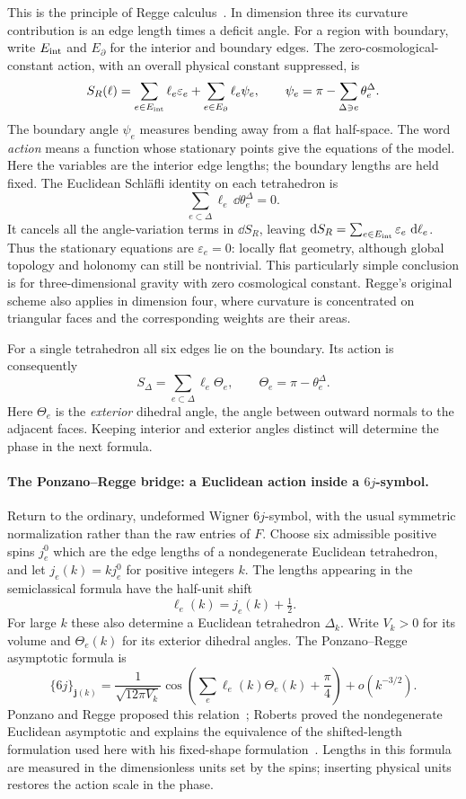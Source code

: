 This is the principle of Regge calculus~\cite{Regge1961}.
In dimension three its curvature contribution is an edge length
times a deficit angle. For a region with boundary, write
$E_{\rm int}$ and $E_{\partial}$ for the interior and boundary edges.
The zero-cosmological-constant action, with an overall physical
constant suppressed, is
\[
 S_R(\ell)=\sum_{e\in E_{\rm int}}\ell_e\varepsilon_e
          +\sum_{e\in E_{\partial}}\ell_e\psi_e,
 \qquad
 \psi_e=\pi-\sum_{\Delta\ni e}\theta_e^\Delta.
\]
The boundary angle $\psi_e$ measures bending away from a flat
half-space. The word \emph{action} means a function whose stationary
points give the equations of the model. Here the variables are the
interior edge lengths; the boundary lengths are held fixed.
The Euclidean Schl\"afli identity on each tetrahedron is
\[
 \sum_{e\subset\Delta}\ell_e\,\dd\theta_e^\Delta=0.
\]
It cancels all the angle-variation terms in $\dd S_R$, leaving
$\mathop{}\!\mathrm d S_R=\sum_{e\in E_{\rm int}}\varepsilon_e\,\mathop{}\!\mathrm d\ell_e$.
Thus the stationary equations are $\varepsilon_e=0$: locally flat
geometry, although global topology and holonomy can still be nontrivial.
This particularly simple conclusion is for three-dimensional gravity
with zero cosmological constant. Regge's original scheme also applies
in dimension four, where curvature is concentrated on triangular
faces and the corresponding weights are their areas.

For a single tetrahedron all six edges lie on the boundary. Its action
is consequently
\[
 S_\Delta=\sum_{e\subset\Delta}\ell_e\Theta_e,\qquad
 \Theta_e=\pi-\theta_e^\Delta.
\]
Here $\Theta_e$ is the \emph{exterior} dihedral angle, the angle
between outward normals to the adjacent faces. Keeping interior and
exterior angles distinct will determine the phase in the next formula.

\paragraph{The Ponzano--Regge bridge: a Euclidean action inside a $6j$-symbol.}
Return to the ordinary, undeformed Wigner $6j$-symbol, with the usual
symmetric normalization rather than the raw entries of $F$.
Choose six admissible positive spins $j_e^0$ which are the edge lengths
of a nondegenerate Euclidean tetrahedron, and let
$j_e(k)=k j_e^0$ for positive integers $k$. The lengths appearing in
the semiclassical formula have the half-unit shift
\[
 \ell_e(k)=j_e(k)+\tfrac12.
\]
For large $k$ these also determine a Euclidean tetrahedron $\Delta_k$.
Write $V_k>0$ for its volume and $\Theta_e(k)$ for its exterior
dihedral angles. The Ponzano--Regge asymptotic formula is
\[
 \{6j\}_{\mathbf j(k)}
 =\frac{1}{\sqrt{12\pi V_k}}
   \cos\left(\sum_e\ell_e(k)\Theta_e(k)+\frac\pi4\right)
   +o(k^{-3/2}).
\]
Ponzano and Regge proposed this relation~\cite{PonzanoRegge};
Roberts proved the nondegenerate Euclidean asymptotic and explains
the equivalence of the shifted-length formulation used here with
his fixed-shape formulation~\cite[Theorem 1 and Section 6.1]{Roberts}.
Lengths in this formula are measured in the dimensionless units
set by the spins; inserting physical units restores the action
scale in the phase.

